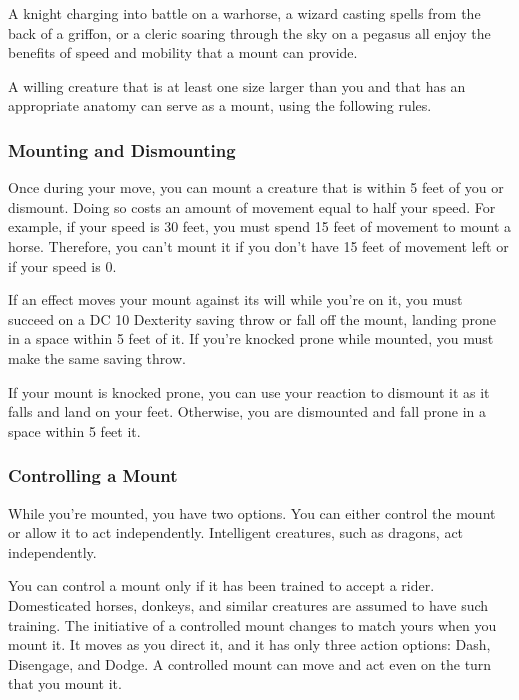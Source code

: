 \documentclass[
]{article}
\begin{document}
A knight charging into battle on a warhorse, a wizard casting spells
from the back of a griffon, or a cleric soaring through the sky on a
pegasus all enjoy the benefits of speed and mobility that a mount can
provide.

A willing creature that is at least one size larger than you and that
has an appropriate anatomy can serve as a mount, using the following
rules.

\hypertarget{mounting-and-dismounting}{%
\subsubsection{Mounting and
Dismounting}\label{mounting-and-dismounting}}

Once during your move, you can mount a creature that is within 5 feet of
you or dismount. Doing so costs an amount of movement equal to half your
speed. For example, if your speed is 30 feet, you must spend 15 feet of
movement to mount a horse. Therefore, you can't mount it if you don't
have 15 feet of movement left or if your speed is 0.

If an effect moves your mount against its will while you're on it, you
must succeed on a DC 10 Dexterity saving throw or fall off the mount,
landing prone in a space within 5 feet of it. If you're knocked prone
while mounted, you must make the same saving throw.

If your mount is knocked prone, you can use your reaction to dismount it
as it falls and land on your feet. Otherwise, you are dismounted and
fall prone in a space within 5 feet it.

\hypertarget{controlling-a-mount}{%
\subsubsection{Controlling a Mount}\label{controlling-a-mount}}

While you're mounted, you have two options. You can either control the
mount or allow it to act independently. Intelligent creatures, such as
dragons, act independently.

You can control a mount only if it has been trained to accept a rider.
Domesticated horses, donkeys, and similar creatures are assumed to have
such training. The initiative of a controlled mount changes to match
yours when you mount it. It moves as you direct it, and it has only
three action options: Dash, Disengage, and Dodge. A controlled mount can
move and act even on the turn that you mount it.
\end{document}
